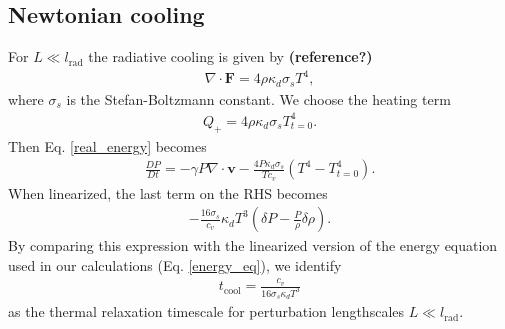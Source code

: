 \subsection{Newtonian cooling}
For $L\ll l_\mathrm{rad}$ the radiative cooling is given by {\bf (reference?)}
\begin{align}
\nabla\cdot\bm{F} = 4 \rho \kappa_d \sigma_s T^4,
\end{align}   
where $\sigma_s$ is the Stefan-Boltzmann constant. We choose the
heating term 
\begin{align}
  Q_+ = 4\rho\kappa_d\sigma_s T^{4}_{t=0}. 
\end{align}
Then Eq. \ref{real_energy} becomes
\begin{align}
  \frac{DP}{Dt} = -\gamma P \nabla\cdot\bm{v} -
  \frac{4P\kappa_d\sigma_s}{Tc_v}\left(T^4 - T_{t=0}^4\right). 
\end{align}
When linearized, the last term on the RHS becomes
\begin{align}
  -\frac{16\sigma_s}{c_v}\kappa_d T^3\left(\delta P -
    \frac{P}{\rho}\delta\rho\right). 
\end{align}
By comparing this expression with the linearized version of the energy
equation used in our calculations (Eq. \ref{energy_eq}), we identify 
\begin{align}\label{tc_newton_cool} 
  t_\mathrm{cool} = \frac{c_v}{16\sigma_s\kappa_dT^3}
\end{align}
as the thermal relaxation timescale for perturbation lengthscales
$L\ll l_\mathrm{rad}$. 

